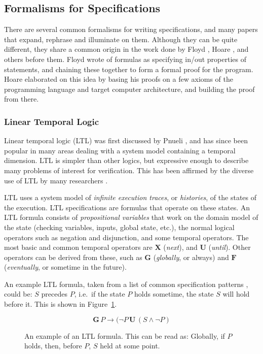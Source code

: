 \documentclass[a4paper,11pt]{kth-mag}
\begin{document}
\subsection{Formalisms for Specifications}

There are several common formalisms for writing specifications, and many papers
that expand, rephrase and illuminate on them. Although they can be quite
different, they share a common origin in the work done by Floyd \cite{floyd67},
Hoare \cite{hoare69}, and others before them. Floyd wrote of formulas as
specifying in/out properties of statements, and chaining these together to form
a formal proof for the program. Hoare elaborated on this idea by basing his
proofs on a few axioms of the programming language and target computer
architecture, and building the proof from there.


\subsubsection{Linear Temporal Logic} \label{section-ltl}

Linear temporal logic (LTL) was first discussed by Pnueli \cite{pnueli77}, and
has since been popular in many areas dealing with a system model containing a
temporal dimension. LTL is simpler than other logics, but expressive enough to
describe many problems of interest for verification. This has been affirmed by
the diverse use of LTL by many researchers \cite{pnueli77}.

LTL uses a system model of \textit{infinite execution traces}, or
\textit{histories}, of the states of the execution. LTL specifications are
formulas that operate on these states. An LTL formula consists of
\textit{propositional variables} that work on the domain model of the state
(checking variables, inputs, global state, etc.), the normal logical operators
such as negation and disjunction, and some temporal operators. The most basic
and common temporal operators are $\boldsymbol{X}$ (\textit{next}), and
$\boldsymbol{U}$ (\textit{until}). Other operators can be derived from these,
such as $\boldsymbol{G}$ (\textit{globally}, or always) and $\boldsymbol{F}$
(\textit{eventually}, or sometime in the future).

An example LTL formula, taken from a list of common specification patterns
\cite{dwyer99patterns}, could be: $S$ precedes $P$, i.e.\ if the state $P$
holds sometime, the state $S$ will hold before it. This is shown in
Figure~\ref{figure-ltl}.

\begin{figure}[h!]
	\[
	\boldsymbol{G} \, P \rightarrow (\neg P \, \boldsymbol{U} \, (S \wedge \neg P)
	\]

	\caption{An example of an LTL formula. This can be read as: Globally, if $P$
	holds, then, before $P$, $S$ held at some point.}
	\label{figure-ltl}
\end{figure}
\end{document}
